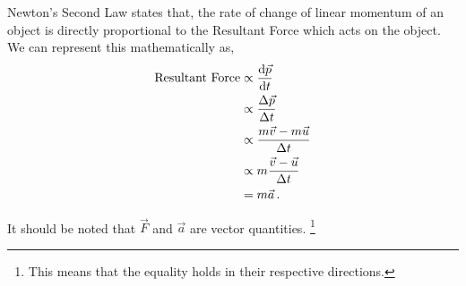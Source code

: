 %
%
%


\begin{subquestions}
	
\subquestion

\begin{subsubquestions}
	
\subsubquestion

Newton's Second Law states that, the rate of change of linear momentum of an object is directly proportional to the Resultant Force which acts on the object. We can represent this mathematically as,
\begin{align} 
	\text{Resultant Force} & \propto \frac{\mathrm{d}\vec{p}}{\mathrm{d}t} \nonumber \\
	             & \propto \frac{\Delta \vec{p}}{\Delta t} \nonumber \\
	             & \propto \frac{m\vec{v}-m\vec{u}}{\Delta t} \nonumber \\
	             & \propto m\frac{\vec{v}-\vec{u}}{\Delta t} \nonumber \\
	             & = m\vec{a} \,.
\end{align}

It should be noted that $\vec{F}$ and $\vec{a}$ are vector quantities. \footnote{This means that the equality holds in their respective directions.}
\end{subsubquestions}
	

\subsubquestion
	

\end{subquestions}
